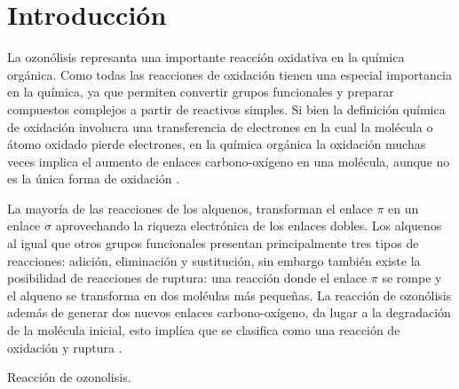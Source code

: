 \documentclass[fleqn,10pt]{SelfArx}
\begin{document}
\flushbottom %

\maketitle %


\thispagestyle{empty} %




\section*{Introducci\'on} %
La ozon\'olisis represanta una importante reacci\'on oxidativa en la qu\'imica org\'anica. Como todas las reacciones de oxidaci\'on tienen una especial importancia en la qu\'imica, ya que permiten convertir grupos funcionales y preparar compuestos complejos a partir de reactivos simples. Si bien la definici\'on qu\'imica de oxidaci\'on involucra una transferencia de electrones en la cual la mol\'ecula o \'atomo oxidado pierde electrones, en la qu\'imica org\'anica la oxidaci\'on muchas veces implica el aumento de enlaces carbono-ox\'igeno en una mol\'ecula, aunque no es la \'unica forma de oxidaci\'on \cite{Gilbert2010}.

La mayor\'ia de las reacciones de los alquenos, transforman el enlace $\pi$ en un enlace $\sigma$ aprovechando la riqueza electr\'onica de los enlaces dobles. Los alquenos al igual que otros grupos funcionales presentan principalmente tres tipos de reacciones: adici\'on, eliminaci\'on y sustituci\'on, sin embargo tambi\'en existe la posibilidad de reacciones de ruptura: una reacci\'on donde el enlace $\pi$ se rompe y el alqueno se transforma en dos mol\'eulas m\'as peque\~nas. La reacci\'on de ozon\'olisis adem\'as de generar dos nuevos enlaces carbono-ox\'igeno, da lugar a la degradaci\'on de la mol\'ecula inicial, esto impl\'ica que se clasifica como una reacci\'on de oxidaci\'on y ruptura \cite{Wade2013}\cite{Morrison2002}.
\begin{scheme}[h]
	\centering
	
	\caption{Reacci\'on de ozonolisis.}
\end{scheme}
\end{document}
